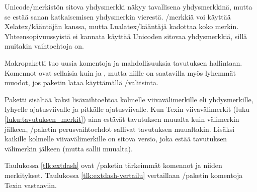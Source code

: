 Unicode\-/merkistön sitova yhdysmerkki  näkyy tavallisena yhdysmerkkinä, mutta se estää sanan
katkaisemisen yhdysmerkin vierestä. \-/merkkiä voi
käyttää Xelatex\-/kääntäjän kanssa, mutta Lualatex\-/kääntäjä kadottaa
koko merkin. Yhteensopivuussyistä ei kannata käyttää Unicoden sitovaa
yhdysmerkkiä, sillä muitakin vaihtoehtoja on.

Makropaketti  tuo uusia komentoja ja
mahdollisuuksia tavutuksen hallintaan. Komennot ovat sellaisia kuin
 ja , mutta niille on
saatavilla myös lyhemmät muodot, jos paketin lataa käyttämällä
\-/valitsinta.

\begin{koodilohkosis}
  \usepackage[shortcuts]{extdash}
\end{koodilohkosis}

Paketti sisältää kaksi lisä\-vaihto\-ehtoa kolmelle viivavälimerkille
eli yhdysmerkille, lyhyelle ajatusviivalle ja pitkälle ajatusviivalle.
Kun Texin viivavälimerkit (luku \ref{luku:tavutuksen_merkit}) aina
estävät tavutuksen muualta kuin välimerkin jälkeen,
\-/paketin perus\-vaihto\-ehdot sallivat tavutuksen
muualtakin. Lisäksi kaikille kolmelle viivavälimerkille on sitova
versio, joka estää tavutuksen välimerkin jälkeen (mutta sallii muualta).

Taulukossa \ref{tlk:extdash} ovat \-/paketin tärkeimmät
komennot ja niiden merkitykset. Taulukossa \ref{tlk:extdash-vertailu}
vertaillaan \-/paketin komentoja Texin vastaaviin.


